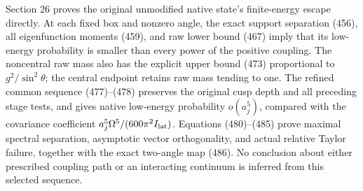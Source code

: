 \documentclass[
  11pt,
]{article}
\begin{document}
Section 26 proves the original unmodified native state's finite-energy
escape directly. At each fixed box and nonzero angle, the exact support
separation (456), all eigenfunction moments (459), and raw lower bound
(467) imply that its low-energy probability is smaller than every power
of the positive coupling. The noncentral raw mass also has the explicit
upper bound (473) proportional to \(g^2/\sin^2\theta\); the central
endpoint retains raw mass tending to one. The refined common sequence
(477)--(478) preserves the original cusp depth and all preceding stage
tests, and gives native low-energy probability \(o(a_j^5)\), compared
with the covariance coefficient \(a_j^5\Omega^5/(600\pi^2I_{\rm lat})\).
Equations (480)--(485) prove maximal spectral separation, asymptotic
vector orthogonality, and actual relative Taylor failure, together with
the exact two-angle map (486). No conclusion about either prescribed
coupling path or an interacting continuum is inferred from this selected
sequence.
\end{document}
